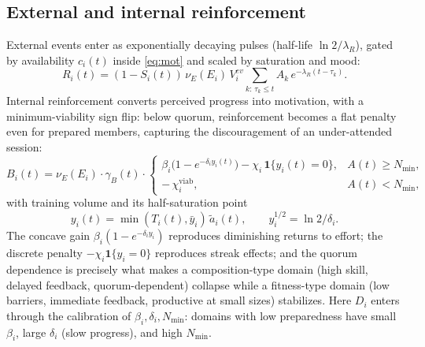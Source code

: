 \documentclass[11pt]{article}
\begin{document}
\subsection{External and internal reinforcement}\label{sec:reinforcement}
External events enter as exponentially decaying pulses (half-life $\ln 2/\lambda_R$), gated by availability $c_i(t)$ inside \eqref{eq:mot} and scaled by saturation and mood:
\begin{equation}\tag{5}\label{eq:external}
R_i(t)=(1-S_i(t))\,\nu_E(E_i)\,V^{ev}_i\!\!\sum_{k:\,\tau_k\le t}\! A_k\,e^{-\lambda_R(t-\tau_k)}.
\end{equation}
Internal reinforcement converts perceived progress into motivation, with a minimum-viability sign flip: below quorum, reinforcement becomes a flat penalty even for prepared members, capturing the discouragement of an under-attended session:
\begin{equation}\tag{6}\label{eq:internal}
B_i(t)=\nu_E(E_i)\cdot\gamma_B(t)\cdot
\begin{cases}
\beta_i\big(1-e^{-\delta_i y_i(t)}\big)-\chi_i\,\mathbf 1\{y_i(t)=0\}, & A(t)\ge N_{\min},\\[3pt]
-\,\chi^{\mathrm{viab}}_i, & A(t)<N_{\min},
\end{cases}
\end{equation}
with training volume and its half-saturation point
\begin{equation*}
y_i(t)=\min(T_i(t),\bar y_i)\,\tilde a_i(t),\qquad y_i^{1/2}=\ln 2/\delta_i.
\end{equation*}
The concave gain $\beta_i(1-e^{-\delta_i y_i})$ reproduces diminishing returns to effort; the discrete penalty $-\chi_i\mathbf 1\{y_i=0\}$ reproduces streak effects; and the quorum dependence is precisely what makes a composition-type domain (high skill, delayed feedback, quorum-dependent) collapse while a fitness-type domain (low barriers, immediate feedback, productive at small sizes) stabilizes. Here $D_i$ enters through the calibration of $\beta_i,\delta_i,N_{\min}$: domains with low preparedness have small $\beta_i$, large $\delta_i$ (slow progress), and high $N_{\min}$.
\end{document}
